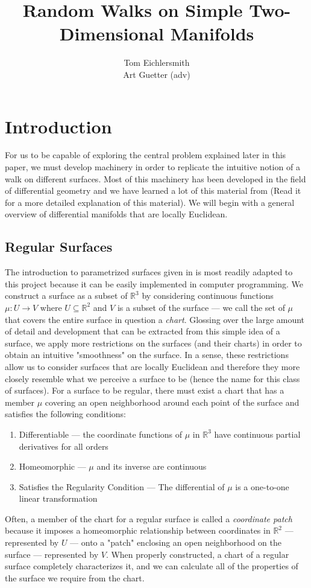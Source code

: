 \documentclass{article}
\title{Random Walks on Simple Two-Dimensional Manifolds}
\author{Tom Eichlersmith \\ Art Guetter (adv)}
\newcommand{\R}{\mathbb{R}}
\begin{document}
\section{Introduction}
	For us to be capable of exploring the central problem explained later in this paper, we must develop machinery in order to replicate the intuitive notion of a walk on different surfaces.
	Most of this machinery has been developed in the field of differential geometry and we have learned a lot of this material from \cite{BanchoffLovett_DiffGeo_2010} (Read it for a more detailed explanation of this material).
	We will begin with a general overview of differential manifolds that are locally Euclidean.
	
	\subsection{Regular Surfaces}
		The introduction to parametrized surfaces given in \cite{BanchoffLovett_DiffGeo_2010} is most readily adapted to this project because it can be easily implemented in computer programming.
		We construct a surface as a subset of $\R^3$ by considering continuous functions $\mu:U \to V$ where $U \subseteq \R^2$ and $V$ is a subset of the surface --- we call the set of $\mu$ that covers the entire surface in question a \textit{chart}.
		Glossing over the large amount of detail and development that can be extracted from this simple idea of a surface, we apply more restrictions on the surfaces (and their charts) in order to obtain an intuitive "smoothness" on the surface.
		In a sense, these restrictions allow us to consider surfaces that are locally Euclidean and therefore they more closely resemble what we perceive a surface to be (hence the name for this class of surfaces).
		For a surface to be regular, there must exist a chart that has a member $\mu$ covering an open neighborhood around each point of the surface and satisfies the following conditions:
		\begin{enumerate}
			\item Differentiable --- the coordinate functions of $\mu$ in $\R^3$ have continuous partial derivatives for all orders
			\item Homeomorphic --- $\mu$ and its inverse are continuous
			\item Satisfies the Regularity Condition --- The differential of $\mu$ is a one-to-one linear transformation
		\end{enumerate}
		Often, a member of the chart for a regular surface is called a \textit{coordinate patch} because it imposes a homeomorphic relationship between coordinates in $\R^2$ --- represented by $U$ --- onto a "patch" enclosing an open neighborhood on the surface --- represented by $V$.
		When properly constructed, a chart of a regular surface completely characterizes it, and we can calculate all of the properties of the surface we require from the chart.
		
\end{document}

